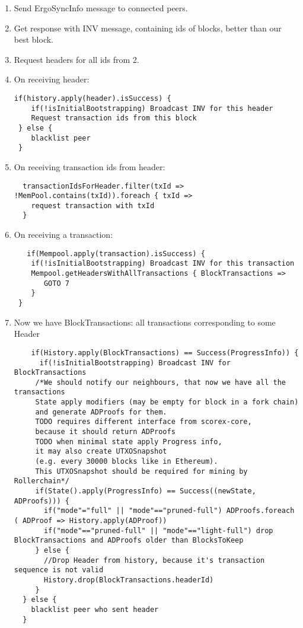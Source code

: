 \documentclass[]{article}   %
\begin{document}
\begin{enumerate}
   \item Send ErgoSyncInfo message to connected peers.
   \item Get response with INV message, containing ids of blocks, better than our best block.
   \item Request headers for all ids from 2.
   \item On receiving header:
   \begin{verbatim}
if(history.apply(header).isSuccess) {
    if(!isInitialBootstrapping) Broadcast INV for this header   
    Request transaction ids from this block
 } else {
    blacklist peer
 }
\end{verbatim} 
\vspace{1em}

   \item On receiving transaction ids from header:
   \begin{verbatim}
  transactionIdsForHeader.filter(txId => !MemPool.contains(txId)).foreach { txId => 
    request transaction with txId
  }
   \end{verbatim}
   \item On receiving a transaction:
   \begin{verbatim}
   if(Mempool.apply(transaction).isSuccess) {
    if(!isInitialBootstrapping) Broadcast INV for this transaction
    Mempool.getHeadersWithAllTransactions { BlockTransactions =>
       GOTO 7
    }
 }
   \end{verbatim}
   \item Now we have BlockTransactions: all transactions corresponding to some Header
   \begin{verbatim}
    if(History.apply(BlockTransactions) == Success(ProgressInfo)) {
      if(!isInitialBootstrapping) Broadcast INV for BlockTransactions
     /*We should notify our neighbours, that now we have all the transactions
     State apply modifiers (may be empty for block in a fork chain)
     and generate ADProofs for them.
     TODO requires different interface from scorex-core,
     because it should return ADProofs
     TODO when minimal state apply Progress info,
     it may also create UTXOSnapshot
     (e.g. every 30000 blocks like in Ethereum).
     This UTXOSnapshot should be required for mining by Rollerchain*/
     if(State().apply(ProgressInfo) == Success((newState, ADProofs))) {
       if("mode"="full" || "mode"=="pruned-full") ADProofs.foreach ( ADProof => History.apply(ADProof))
       if("mode"=="pruned-full" || "mode"=="light-full") drop BlockTransactions and ADProofs older than BlocksToKeep
     } else {
       //Drop Header from history, because it's transaction sequence is not valid
       History.drop(BlockTransactions.headerId)
     }
  } else {
    blacklist peer who sent header
  }
   \end{verbatim}
\end{enumerate}
\end{document}
